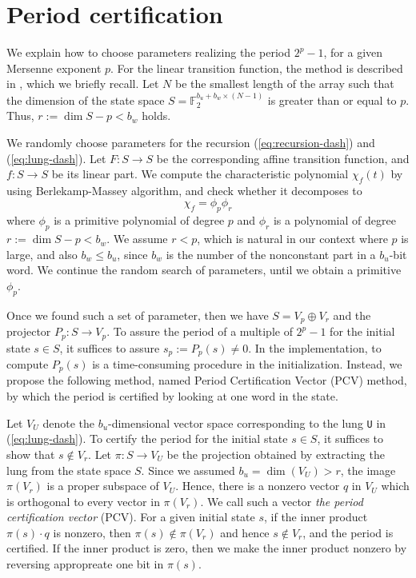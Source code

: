 \documentclass{svmult}
\begin{document}
\section{Period certification}
\label{sec:PCV}
We explain how to choose parameters 
realizing the period $2^p-1$, for a given
Mersenne exponent $p$.
For the linear transition function, the method is 
described in \cite{SFMT}, which we briefly 
recall.
Let 
$N$ be the smallest length of the array such that
the dimension of the state space 
$S={\mathbb F}_2^{b_u + b_w \times (N-1)}$
is greater than or equal to $p$. Thus, 
$r:=\dim S - p < b_w$ holds.

We randomly choose parameters for the recursion 
(\ref{eq:recursion-dash}) and
(\ref{eq:lung-dash}). Let $F:S \to S$ be the 
corresponding affine transition function, and $f:S \to S$ be
its linear part. We compute the characteristic
polynomial $\chi_f(t)$ by using Berlekamp-Massey algorithm, and
check whether it decomposes to 
\[
\chi_f=\phi_p \phi_r
\]
where $\phi_p$ is a primitive polynomial of degree $p$
and $\phi_r$ is a polynomial of degree %
$r:=\dim S -p < b_w$. We assume $r<p$, which is natural
in our context where $p$ is large, and also $b_w\leq b_u$,
since $b_w$ is the number of the nonconstant part in 
a $b_u$-bit word.
We continue the random search of parameters, 
until we obtain a primitive $\phi_p$.

Once we found such a set of parameter, then we have
$S=V_p \oplus V_r$ and the projector $P_p: S \to V_p$.
To assure the period of a multiple of $2^p-1$ for the initial state $s \in S$,
it suffices to assure $s_p:=P_p (s) \neq 0$. 
In the implementation, to compute $P_p(s)$ is a time-consuming
procedure in the initialization. Instead, we propose the 
following method, named Period Certification Vector (PCV) method,
by which the period is certified by looking at one word in the state.

Let $V_U$ denote the $b_u$-dimensional vector space corresponding to the lung 
\texttt{U} in (\ref{eq:lung-dash}). To certify the period for
the initial state $s \in S$, it suffices to show that
$s \notin V_r$. Let $\pi:S \to V_U$ be the projection obtained
by extracting the lung from the state space $S$. Since we assumed
$b_u=\dim (V_U)>r$, the image $\pi (V_r)$ is a proper subspace of $V_U$.
Hence, there is a nonzero vector $q$ in $V_U$ which is orthogonal
to every vector in $\pi (V_r)$. We call such a vector {\em the period certification vector} (PCV).
For a given initial state $s$, if the inner product $\pi(s)\cdot q$ is nonzero,
then $\pi(s) \notin \pi(V_r)$ and hence $s \notin V_r$, and the period is certified. If
the inner product is zero, then we make the inner product nonzero by reversing 
appropreate one bit in $\pi(s)$.
\end{document}
